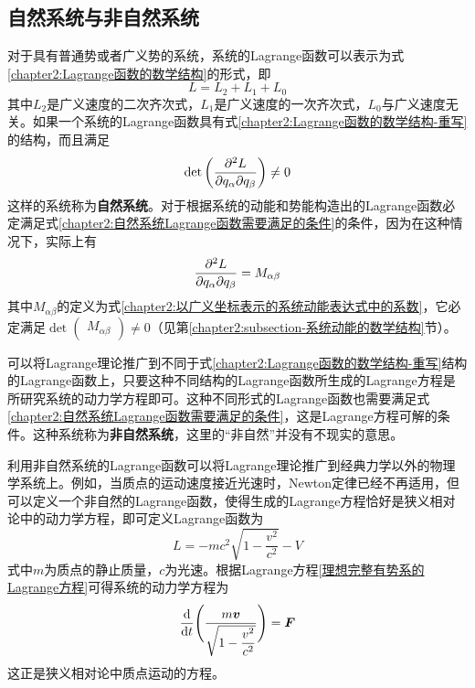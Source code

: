 \subsection{自然系统与非自然系统}

对于具有普通势或者广义势的系统，系统的Lagrange函数可以表示为式\eqref{chapter2:Lagrange函数的数学结构}的形式，即
\begin{equation}
	L = L_2+L_1+L_0
	\label{chapter2:Lagrange函数的数学结构-重写}
\end{equation}
其中$L_2$是广义速度的二次齐次式，$L_1$是广义速度的一次齐次式，$L_0$与广义速度无关。如果一个系统的Lagrange函数具有式\eqref{chapter2:Lagrange函数的数学结构-重写}的结构，而且满足
\begin{equation}
	\det\begin{pmatrix} \dfrac{\partial^2 L}{\partial q_\alpha\partial q_\beta} \end{pmatrix} \neq 0
	\label{chapter2:自然系统Lagrange函数需要满足的条件}
\end{equation}
这样的系统称为{\bf 自然系统}。对于根据系统的动能和势能构造出的Lagrange函数必定满足式\eqref{chapter2:自然系统Lagrange函数需要满足的条件}的条件，因为在这种情况下，实际上有
\begin{equation*}
	\dfrac{\partial^2 L}{\partial q_\alpha\partial q_\beta} = M_{\alpha\beta}
\end{equation*}
其中$M_{\alpha\beta}$的定义为式\eqref{chapter2:以广义坐标表示的系统动能表达式中的系数}，它必定满足$\det\begin{pmatrix} M_{\alpha\beta}\end{pmatrix} \neq 0$（见第\ref{chapter2:subsection-系统动能的数学结构}节）。

可以将Lagrange理论推广到不同于式\eqref{chapter2:Lagrange函数的数学结构-重写}结构的Lagrange函数上，只要这种不同结构的Lagrange函数所生成的Lagrange方程是所研究系统的动力学方程即可。这种不同形式的Lagrange函数也需要满足式\eqref{chapter2:自然系统Lagrange函数需要满足的条件}，这是Lagrange方程可解的条件。这种系统称为{\bf 非自然系统}，这里的“非自然”并没有不现实的意思。

利用非自然系统的Lagrange函数可以将Lagrange理论推广到经典力学以外的物理学系统上。例如，当质点的运动速度接近光速时，Newton定律已经不再适用，但可以定义一个非自然的Lagrange函数，使得生成的Lagrange方程恰好是狭义相对论中的动力学方程，即可定义Lagrange函数为
\begin{equation}
	L = -mc^2\sqrt{1-\frac{v^2}{c^2}} - V
\end{equation}
式中$m$为质点的静止质量，$c$为光速。根据Lagrange方程\eqref{理想完整有势系的Lagrange方程}可得系统的动力学方程为
\begin{equation}
	\dfrac{\mathrm{d}}{\mathrm{d} t}\Bigg(\frac{m\boldsymbol{v}}{\sqrt{1-\dfrac{v^2}{c^2}}}\Bigg) = \boldsymbol{F}
\end{equation}
这正是狭义相对论中质点运动的方程。

